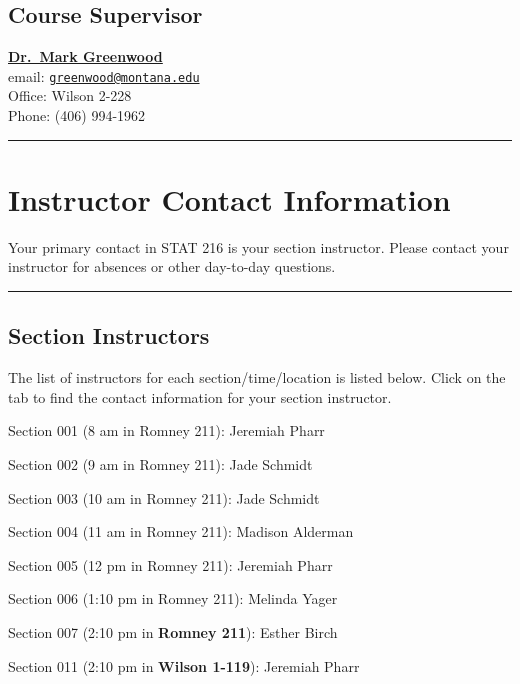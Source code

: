 \documentclass[
]{article}
\begin{document}
\subsection{Course Supervisor}\label{course-supervisor}

\href{https://math.montana.edu/directory/faculty/1524138/mark-greenwood}{\textbf{Dr.~Mark
Greenwood}}\\
email:
\href{mailto:greenwood@montana.edu}{\nolinkurl{greenwood@montana.edu}}\\
Office: Wilson 2-228\\
Phone: (406) 994-1962

\begin{center}\rule{0.5\linewidth}{0.5pt}\end{center}

\section{Instructor Contact
Information}\label{instructor-contact-information}

Your primary contact in STAT 216 is your section instructor. Please
contact your instructor for absences or other day-to-day questions.

\begin{center}\rule{0.5\linewidth}{0.5pt}\end{center}

\subsection{Section Instructors}\label{section-instructors}

The list of instructors for each section/time/location is listed below.
Click on the tab to find the contact information for your section
instructor.

Section 001 (8 am in Romney 211): Jeremiah Pharr

Section 002 (9 am in Romney 211): Jade Schmidt

Section 003 (10 am in Romney 211): Jade Schmidt

Section 004 (11 am in Romney 211): Madison Alderman

Section 005 (12 pm in Romney 211): Jeremiah Pharr

Section 006 (1:10 pm in Romney 211): Melinda Yager

Section 007 (2:10 pm in \textbf{Romney 211}): Esther Birch

Section 011 (2:10 pm in \textbf{Wilson 1-119}): Jeremiah Pharr
\end{document}
